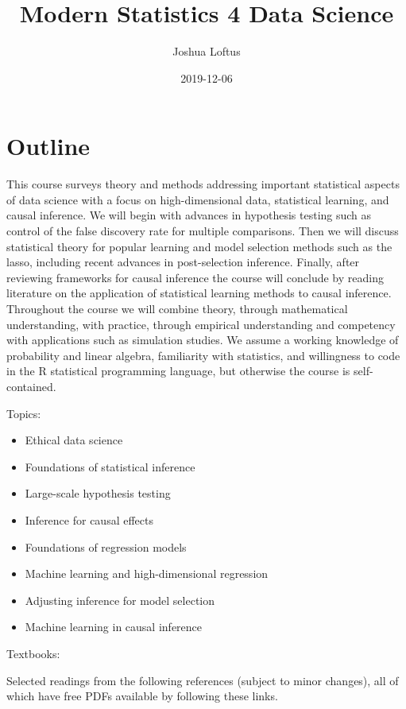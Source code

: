 \documentclass[]{book}
\title{Modern Statistics 4 Data Science}
\author{Joshua Loftus}
\date{2019-12-06}
\providecommand{\tightlist}{%
  \setlength{\itemsep}{0pt}\setlength{\parskip}{0pt}}
\theoremstyle{definition}
\theoremstyle{definition}
\theoremstyle{definition}
\theoremstyle{remark}
\begin{document}
\maketitle

{
\setcounter{tocdepth}{1}
\tableofcontents
}
\chapter{Outline}\label{outline}

This course surveys theory and methods addressing important statistical
aspects of data science with a focus on high-dimensional data,
statistical learning, and causal inference. We will begin with advances
in hypothesis testing such as control of the false discovery rate for
multiple comparisons. Then we will discuss statistical theory for
popular learning and model selection methods such as the lasso,
including recent advances in post-selection inference. Finally, after
reviewing frameworks for causal inference the course will conclude by
reading literature on the application of statistical learning methods to
causal inference. Throughout the course we will combine theory, through
mathematical understanding, with practice, through empirical
understanding and competency with applications such as simulation
studies. We assume a working knowledge of probability and linear
algebra, familiarity with statistics, and willingness to code in the R
statistical programming language, but otherwise the course is
self-contained.

Topics:

\begin{itemize}
\tightlist
\item
  Ethical data science
\item
  Foundations of statistical inference
\item
  Large-scale hypothesis testing
\item
  Inference for causal effects
\item
  Foundations of regression models
\item
  Machine learning and high-dimensional regression
\item
  Adjusting inference for model selection
\item
  Machine learning in causal inference
\end{itemize}

Textbooks:

Selected readings from the following references (subject to minor
changes), all of which have free PDFs available by following these
links.
\end{document}
